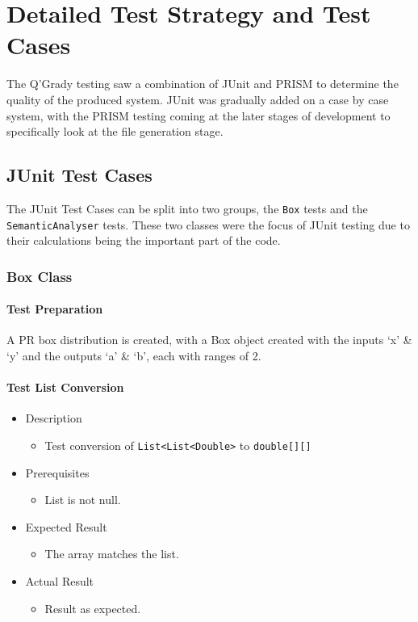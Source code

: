 \documentclass[report.tex]{subfiles}
\begin{document}
\chapter{Detailed Test Strategy and Test Cases} %
\label{cha:detailed_test_strategy_and_test_cases}
The Q'Grady testing saw a combination of JUnit and PRISM to determine the
quality of the produced system. JUnit was gradually added on a case by case
system, with the PRISM testing coming at the later stages of development to
specifically look at the file generation stage.

\section{JUnit Test Cases} %
\label{sec:junit_test_cases}
The JUnit Test Cases can be split into two groups, the \texttt{Box} tests and
the \texttt{SemanticAnalyser} tests. These two classes were the focus of JUnit
testing due to their calculations being the important part of the code.

\subsection{Box Class} %
\label{sub:box_class}
\subsubsection{Test Preparation} %
\label{ssub:test_preparation}
A PR box distribution is created, with a Box object created with the inputs
`x' & `y' and the outputs `a' & `b', each with ranges of 2.

\subsubsection{Test List Conversion} %
\label{ssub:test_list_conversion}
\begin{itemize}
    \item Description
    \begin{itemize}
        \item Test conversion of \texttt{List<List<Double>} to
        \texttt{double[][]}
    \end{itemize}
    \item Prerequisites
    \begin{itemize}
        \item List is not null.
    \end{itemize}
    \item Expected Result
    \begin{itemize}
        \item The array matches the list.
    \end{itemize}
    \item Actual Result
    \begin{itemize}
        \item Result as expected.
    \end{itemize}
\end{itemize}
\end{document}
